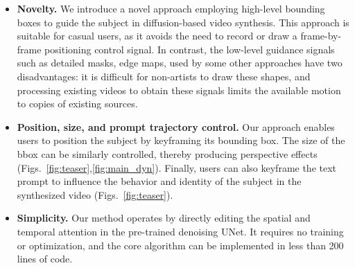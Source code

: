 \begin{itemize}
    \item \textbf{Novelty.} We introduce a novel approach employing high-level bounding boxes to guide the subject in diffusion-based video synthesis. This approach is suitable for casual users, as it avoids the need to record or draw a frame-by-frame positioning control signal. In contrast, the low-level guidance signals such as detailed masks, edge maps, used by some other approaches have two disadvantages: it is difficult for non-artists to draw these shapes, and processing existing videos to obtain these signals limits the available motion to copies of existing sources.

    \item \textbf{Position, size, and prompt trajectory control.} Our approach enables users to position the subject by keyframing its bounding box. The size of the bbox can be similarly controlled, thereby producing perspective effects (Figs.~\ref{fig:teaser},\ref{fig:main_dyn}).
    Finally, users can also keyframe the text prompt to
    influence the behavior and identity of the subject in the synthesized video (Figs.~\ref{fig:teaser}).

    \item \textbf{Simplicity.} Our method operates by directly editing the spatial and temporal attention in the pre-trained denoising UNet. It requires no training or optimization, and the core algorithm can be implemented in less than 200 lines of code.

\end{itemize}